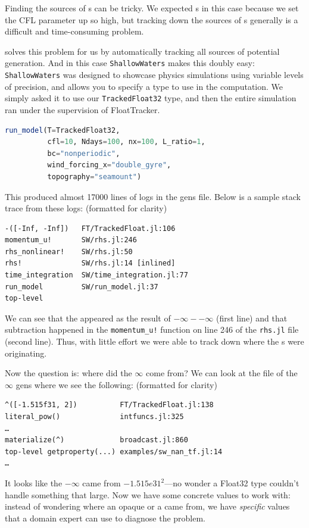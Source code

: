 \documentclass{juliacon}
\begin{document}
Finding the sources of \NaN{}s can be tricky.
We expected \NaN{}s in this case because we set the CFL parameter up so high, but tracking down the sources of \NaN{}s generally is a difficult and time-consuming problem.

\FT{} solves this problem for us by automatically tracking all sources of potential \NaN{} generation.
And in this case \texttt{ShallowWaters} makes this doubly easy:
\texttt{ShallowWaters} was designed to showcase physics simulations using variable levels of \fp{} precision, and allows you to specify a \fp{} type to use in the computation.
We simply asked it to use our \texttt{TrackedFloat32} type, and then the entire simulation ran under the supervision of FloatTracker.

\begin{lstlisting}[language = Julia]
run_model(T=TrackedFloat32,
          cfl=10, Ndays=100, nx=100, L_ratio=1,
          bc="nonperiodic",
          wind_forcing_x="double_gyre",
          topography="seamount")
\end{lstlisting}

This produced almost 17000 lines of logs in the gens file. Below is a sample stack trace from these logs: (formatted for clarity)

\begin{verbatim}
-([-Inf, -Inf])   FT/TrackedFloat.jl:106
momentum_u!       SW/rhs.jl:246
rhs_nonlinear!    SW/rhs.jl:50
rhs!              SW/rhs.jl:14 [inlined]
time_integration  SW/time_integration.jl:77
run_model         SW/run_model.jl:37
top-level
\end{verbatim}

We can see that the \NaN{} appeared as the result of $-\infty - -\infty$ (first line) and that subtraction happened in the \texttt{momentum\_u!} function on line 246 of the \texttt{rhs.jl} file (second line).
Thus, with little effort we were able to track down where the \NaN{}s were originating.

Now the question is: where did the $\infty$ come from?
We can look at the file of the $\infty$ gens where we see the following: (formatted for clarity)

\begin{verbatim}
^([-1.515f31, 2])          FT/TrackedFloat.jl:138
literal_pow()              intfuncs.jl:325
…
materialize(^)             broadcast.jl:860
top-level getproperty(...) examples/sw_nan_tf.jl:14
…
\end{verbatim}

It looks like the $-\infty$ came from $-1.515e31^2$---no wonder a Float32 type couldn't handle something that large.
Now we have some concrete values to work with: instead of wondering where an opaque \Inf{} or a \NaN{} came from, we have \emph{specific} values that a domain expert can use to diagnose the problem.
\end{document}
